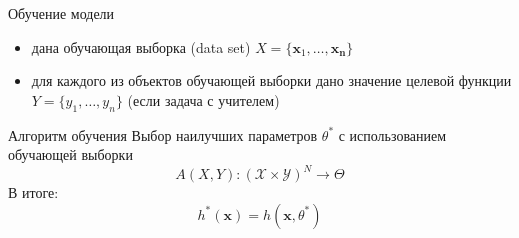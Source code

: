 \documentclass[aspectratio=169]{beamer}
\begin{document}
\begin{frame}{Обучение модели}

\begin{itemize}
\item дана обучающая выборка (data set) $X = \{{\mathbf{x}_1, \ldots, \mathbf{x_n}}\}$
\item для каждого из объектов обучающей выборки дано значение целевой функции $Y = \{y_1, \ldots, y_n\}$ (если задача с учителем)
\end{itemize}

\begin{block}{Алгоритм обучения}
Выбор наилучших параметров $\theta^*$ с использованием обучающей выборки
\[
A(X, Y): (\mathcal{X} \times \mathcal{Y})^N \rightarrow \Theta
\]
В итоге:
\[
h^*(\mathbf{x}) = h(\mathbf{x}, \theta^*)
\]
\end{block}

\end{frame}
\end{document}

